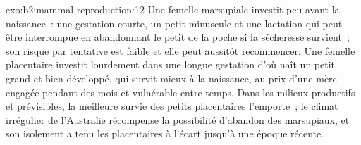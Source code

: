 \begin{solution}{exo:b2:mammal-reproduction:12}
Une femelle marsupiale investit peu avant la naissance~: une gestation
courte, un petit minuscule et une lactation qui peut être interrompue
en abandonnant le petit de la poche si la sécheresse survient~; son
risque par tentative est faible et elle peut aussitôt recommencer. Une
femelle placentaire investit lourdement dans une longue gestation d'où
naît un petit grand et bien développé, qui survit mieux à la naissance,
au prix d'une mère engagée pendant des mois et vulnérable entre-temps.
Dans les milieux productifs et prévisibles, la meilleure survie des
petits placentaires l'emporte~; le climat irrégulier de l'Australie
récompense la possibilité d'abandon des marsupiaux, et son isolement a
tenu les placentaires à l'écart jusqu'à une époque récente.
\end{solution}

